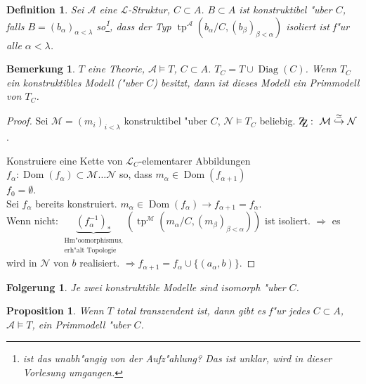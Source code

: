 \documentclass[a4paper,12pt,numbers=noenddot,parskip=full]{scrartcl}
\newcommand{\scrL}{\mathcal{L}}
\newcommand{\scrA}{\mathcal{A}}
\newcommand{\scrM}{\mathcal{M}}
\newcommand{\scrN}{\mathcal{N}}
\newcommand{\zz}{\mathrm{Z\kern-.3em\raise-0.5ex\hbox{Z}}:~}
\DeclareMathOperator{\Diag}{Diag}
\newcommand{\vdig}{\Diag}
\DeclareMathOperator{\dom}{Dom}
\DeclareMathOperator{\typ}{tp}
\theoremstyle{dotless}
\newtheorem{corollary}[theorem]{Folgerung}
\newtheorem{proposition}[theorem]{Proposition}
\newtheorem{definition}[theorem]{Definition}
\newtheorem{remark}[theorem]{Bemerkung}
\begin{document}
\begin{definition}
	Sei $\scrA$ eine $\scrL$-Struktur, $C \subset A$. $B \subset A$ ist \emph{konstruktibel "uber $C$}, falls $B = (b_\alpha)_{\alpha<\lambda}$ so\footnote{ist das unabh"angig von der Aufz"ahlung? Das ist unklar, wird in dieser Vorlesung umgangen.}, dass der Typ $\typ^\scrA(b_\alpha / C, (b_\beta)_{\beta<\alpha})$ isoliert ist f"ur alle $\alpha < \lambda$.
\end{definition}
\begin{remark}
	$T$ eine Theorie, $\scrA \models T$, $C \subset A$. $T_C = T \cup \vdig(C)$. Wenn $T_C$ ein konstruktibles Modell ("uber $C$) besitzt, dann ist dieses Modell ein Primmodell von $T_C$.
\end{remark}
\begin{proof}
	Sei $\scrM = (m_i)_{i < \lambda}$ konstruktibel "uber $C$, $\scrN \models T_C$ beliebig. $\zz \scrM \overset{\simeq}{\hookrightarrow} \scrN$.
	
	Konstruiere eine Kette von $\scrL_C$-elementarer Abbildungen $f_\alpha: \dom(f_\alpha) \subset \scrM \dots \scrN$ so, dass $m_\alpha \in \dom(f_{\alpha+1})$\\
	$f_0 = \emptyset$.\\
	Sei $f_\alpha$ bereits konstruiert. $m_\alpha \in \dom(f_\alpha) \longrightarrow f_{\alpha+1} = f_\alpha$.\\
	Wenn nicht: $\underbrace{(f_\alpha^{-1})_*}_{\substack{\text{Hm"oomorphismus,}\\\text{erh"alt Topologie}}} (\typ^\scrM (m_\alpha / C, (m_\beta)_{\beta < \alpha}))$ ist isoliert. $\Longrightarrow$ es wird in $\scrN$ von $b$ realisiert. $\Longrightarrow f_{\alpha+1} = f_\alpha \cup \{(a_\alpha, b) \}$.
\end{proof}
\begin{corollary}
	Je zwei konstruktible Modelle sind isomorph "uber $C$. %
\end{corollary}
\begin{proposition}
	Wenn $T$ total transzendent ist, dann gibt es f"ur jedes $C \subset A$, $\scrA \models T$, ein Primmodell "uber $C$.
\end{proposition}
\end{document}
